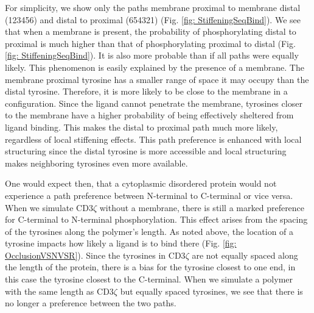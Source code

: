 \documentclass[../../AdvancementSummary.tex]{subfiles}
\begin{document}
For simplicity, we show only the paths membrane proximal to membrane distal (123456) and distal to proximal (654321) (Fig. \ref{fig: StiffeningSeqBind}). We see that when a membrane is present, the probability of phosphorylating distal to proximal is much higher than that of phosphorylating proximal to distal (Fig. \ref{fig: StiffeningSeqBind}). It is also more probable than if all paths were equally likely. This phenomenon is easily explained by the presence of a membrane. The membrane proximal tyrosine has a smaller range of space it may occupy than the distal tyrosine. Therefore, it is more likely to be close to the membrane in a configuration. Since the ligand cannot penetrate the membrane, tyrosines closer to the membrane have a higher probability of being effectively sheltered from ligand binding. This makes the distal to proximal path much more likely, regardless of local stiffening effects. This path preference is enhanced with local structuring since the distal tyrosine is more accessible and local structuring makes neighboring tyrosines even more available.

One would expect then, that a cytoplasmic disordered protein would not experience a path preference between N-terminal to C-terminal or vice versa. When we simulate CD3$\zeta$ without a membrane, there is still a marked preference for C-terminal to N-terminal phosphorylation. This effect arises from the spacing of the tyrosines along the polymer's length. As noted above, the location of a tyrosine impacts how likely a ligand is to bind there (Fig. \ref{fig: OcclusionVSNVSR}). Since the tyrosines in CD3$\zeta$ are not equally spaced along the length of the protein, there is a bias for the tyrosine closest to one end, in this case the tyrosine closest to the C-terminal. When we simulate a polymer with the same length as CD3$\zeta$ but equally spaced tyrosines, we see that there is no longer a preference between the two paths.
\end{document}
